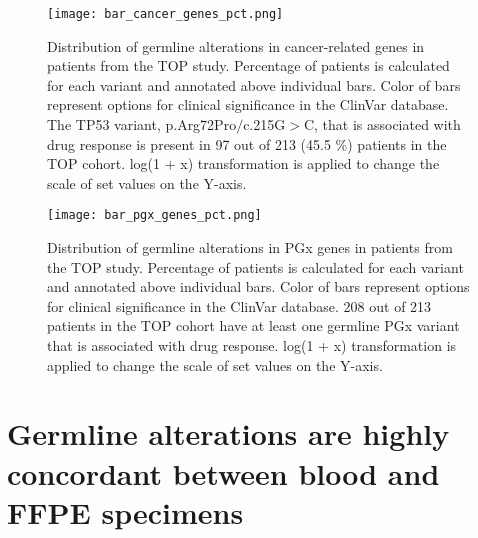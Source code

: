 
\begin{landscape}

\begin{figure}[H]
\centering
	\texttt{[image: bar\_cancer\_genes\_pct.png]}
	\caption[Distribution of germline alterations in cancer-related genes in patients from the TOP study.]{Distribution of germline alterations in cancer-related genes in patients from the TOP study. Percentage of patients is calculated for each variant and annotated above individual bars. Color of bars represent options for clinical significance in the ClinVar database. The TP53 variant, p.Arg72Pro$/$c.215G$>$C, that is associated with drug response is present in 97 out of 213 (45.5 \%) patients in the TOP cohort. log(1 + x) transformation is applied to change the scale of set values on the Y-axis.}
	\label{fig:bar_cancer_genes}
\end{figure}

\end{landscape}


\begin{landscape}

\begin{figure}[H]
\centering
	\texttt{[image: bar\_pgx\_genes\_pct.png]}
	\caption[Distribution of germline alterations in PGx genes in patients from the TOP study.]{Distribution of germline alterations in PGx genes in patients from the TOP study. Percentage of patients is calculated for each variant and annotated above individual bars. Color of bars represent options for clinical significance in the ClinVar database. 208 out of 213 patients in the TOP cohort have at least one germline PGx variant that is associated with drug response. log(1 + x) transformation is applied to change the scale of set values on the Y-axis.}
	\label{fig:bar_pgx_genes}
\end{figure}

\end{landscape}

\section{Germline alterations are highly concordant between blood and FFPE specimens}
\label{sec:GermlinealterationsarehighlyconcordantbetweenbloodandFFPEspecimens}

